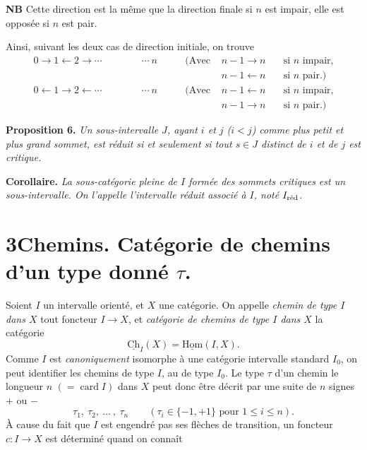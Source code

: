 \documentclass[11pt]{article}
\newcommand{\printedpage}[1]{\marginpar{\footnotesize p.~#1}}
\newcommand{\msp}[1]{\marginpar{\footnotesize [#1]}}
\newcommand{\Ch}{\underline{\mathrm{Ch}}}
\newcommand{\uHom}{\underline{\mathrm{Hom}}}
\begin{document}
\textbf{NB} Cette direction est la même que la direction finale si $n$ est impair, elle est opposée si $n$ est pair.

Ainsi, suivant les deux cas de direction initiale, on trouve
\[
\begin{aligned}
0 \longrightarrow 1 \longleftarrow 2 \longrightarrow \cdots \qquad\qquad \cdots\ n & \qquad (\text{Avec } & n-1 \longrightarrow n & \quad \text{si } n \text{ impair,}\\
& & n-1 \longleftarrow n & \quad \text{si } n \text{ pair.)}\\
0 \longleftarrow 1 \longrightarrow 2 \longleftarrow \cdots \qquad\qquad \cdots\ n & \qquad (\text{Avec } & n-1 \longleftarrow n & \quad \text{si } n \text{ impair,}\\
& & n-1 \longrightarrow n & \quad \text{si } n \text{ pair.)}
\end{aligned}
\]

\printedpage{8}

\textbf{Proposition 6.} \textit{Un sous-intervalle $J$, ayant $i$ et $j$ ($i < j$) comme plus petit et plus grand sommet, est réduit si et seulement si tout $s \in J$ distinct de $i$ et de $j$ est critique.}

\textbf{Corollaire.} \textit{La sous-catégorie pleine de $I$ formée des sommets critiques est un sous-intervalle. On l'appelle l'intervalle réduit associé à $I$, noté $I_{\textup{réd}}$.}

\printedpage{9}

\msp{page 13}

\section*{3\quad Chemins. Catégorie de chemins d'un type donné $\tau$.}

Soient $I$ un intervalle orienté, et $X$ une catégorie. On appelle \textit{chemin de type $I$ dans $X$} tout foncteur $I \longrightarrow X$, et \textit{catégorie de chemins de type $I$ dans $X$} la catégorie
\[
\Ch_I(X) = \uHom(I,X).
\]
Comme $I$ est \textit{canoniquement} isomorphe à une catégorie intervalle standard $I_0$, on peut identifier les chemins de type $I$, au de type $I_0$. Le type $\tau$ d'un chemin le longueur $n$ $(= \operatorname{card} I)$ dans $X$ peut donc être décrit par une suite de $n$ signes $+$ ou $-$ %
\[
\tau_1,\ \tau_2,\ \dots\ ,\ \tau_n \qquad (\tau_i \in \{-1,+1\} \text{ pour } 1 \leq i \leq n).
\]
À cause du fait que $I$ est engendré pas ses flèches de transition, un foncteur $c : I \longrightarrow X$ est déterminé quand on connaît %
\end{document}
